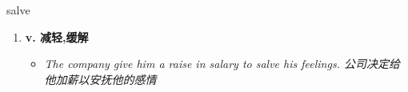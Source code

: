 
\begin{frame}
{\huge salve}
\begin{center}
\begin{enumerate}\Large
  \item \textbf{v. 减轻,缓解}
  \begin{itemize}
    \item \em{\Large{The company give him a raise in salary to salve his feelings. 公司决定给他加薪以安抚他的感情}}
  \end{itemize}
\end{enumerate}
\end{center}
\end{frame}
